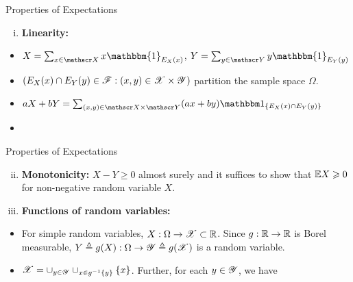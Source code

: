\documentclass[12pt,aspectratio=169]{beamer}
\begin{document}
\begin{frame}{Properties of Expectations}
\begin{Proof}
\begin{enumerate}[(i)]
\item \textbf{Linearity:}
\end{enumerate}
\begin{itemize}
\item <1-> $X = \sum_{x \in \sX}x\mathbbm{1}_{E_X(x)}$, $Y =  \sum_{y \in \sY}y\mathbbm{1}_{E_Y(y)}$ 
\item <2-> $(E_X(x)\cap E_Y(y) \in \mathscr{F}: (x, y)\in \mathscr{X} \times \mathscr{Y})$ partition the sample space $\Omega$. 
\item <3-> $aX + bY = \sum_{(x,y) \in \sX \times \sY}(ax+by)\SetIn{E_X(x)\cap E_Y(y)}$ 
\item <4-> 
\end{itemize}
\end{Proof}
\end{frame}

\begin{frame}{Properties of Expectations}
\begin{Proof}
\begin{enumerate}[(i)]
\setcounter{enumi}{1}
\item <1-> \textbf{Monotonicity:} $X-Y \ge 0$ almost surely and it suffices to show that $\mathbb{E} X \geqslant 0$ for non-negative random variable $X$.
\end{enumerate}
\begin{enumerate}[(i)]
\setcounter{enumi}{2}
\item <2-> \textbf{Functions of random variables:}
\end{enumerate}
\begin{itemize}
\item <2-> For simple random variables, $X: \Omega \to \mathscr{X} \subset \mathbb{R}$. 
Since $g: \mathbb{R} \to \mathbb{R}$ is Borel measurable, $Y \triangleq g(X): \Omega\to\mathscr{Y} \triangleq g(\mathscr{X})$ is a random variable. 
\item <3-> $\mathscr{X} = \cup_{y\in \mathscr{Y}}\cup_{x \in g^{-1}\left\{y\right\}}\left\{x\right\}$. 
Further, for each $y \in \mathscr{Y}$, we have 
\end{itemize}
\end{Proof}
\end{frame}
\end{document}
